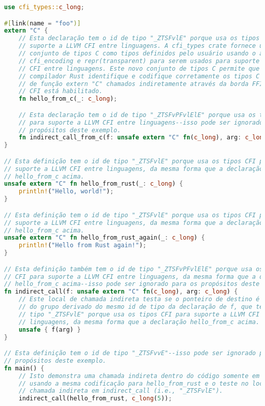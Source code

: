 \documentclass{article}
\begin{document}
\begin{lstlisting}[language=Rust, caption={Exemplo de programa Rust usando tipos inteiros Rust e a codificação do compilador Rust com os tipos da crate cfi\_types.}]
use cfi_types::c_long;

#[link(name = "foo")]
extern "C" {
    // Esta declaração tem o id de tipo "_ZTSFvlE" porque usa os tipos CFI para
    // suporte a LLVM CFI entre linguagens. A cfi_types crate fornece um novo
    // conjunto de tipos C como tipos definidos pelo usuário usando o atributo
    // cfi_encoding e repr(transparent) para serem usados para suporte a LLVM
    // CFI entre linguagens. Este novo conjunto de tipos C permite que o
    // compilador Rust identifique e codifique corretamente os tipos C em tipos
    // de função extern "C" chamados indiretamente através da borda FFI quando
    // CFI está habilitado.
    fn hello_from_c(_: c_long);

    // Esta declaração tem o id de tipo "_ZTSFvPFvlElE" porque usa os tipos CFI
    // para suporte a LLVM CFI entre linguagens--isso pode ser ignorado para os
    // propósitos deste exemplo.
    fn indirect_call_from_c(f: unsafe extern "C" fn(c_long), arg: c_long);
}

// Esta definição tem o id de tipo "_ZTSFvlE" porque usa os tipos CFI para
// suporte a LLVM CFI entre linguagens, da mesma forma que a declaração
// hello_from_c acima.
unsafe extern "C" fn hello_from_rust(_: c_long) {
    println!("Hello, world!");
}

// Esta definição tem o id de tipo "_ZTSFvlE" porque usa os tipos CFI para
// suporte a LLVM CFI entre linguagens, da mesma forma que a declaração
// hello_from_c acima.
unsafe extern "C" fn hello_from_rust_again(_: c_long) {
    println!("Hello from Rust again!");
}

// Esta definição também tem o id de tipo "_ZTSFvPFvlElE" porque usa os tipos
// CFI para suporte a LLVM CFI entre linguagens, da mesma forma que a declaração
// hello_from_c acima--isso pode ser ignorado para os propósitos deste exemplo.
fn indirect_call(f: unsafe extern "C" fn(c_long), arg: c_long) {
    // Este local de chamada indireta testa se o ponteiro de destino é um membro
    // do grupo derivado do mesmo id de tipo da declaração de f, que tem o id de
    // tipo "_ZTSFvlE" porque usa os tipos CFI para suporte a LLVM CFI entre
    // linguagens, da mesma forma que a declaração hello_from_c acima.
    unsafe { f(arg) }
}

// Esta definição tem o id de tipo "_ZTSFvvE"--isso pode ser ignorado para os
// propósitos deste exemplo.
fn main() {
    // Isto demonstra uma chamada indireta dentro do código somente em Rust
    // usando a mesma codificação para hello_from_rust e o teste no local de
    // chamada indireta em indirect_call (i.e., "_ZTSFvlE").
    indirect_call(hello_from_rust, c_long(5));


\end{lstlisting}
\end{document}
